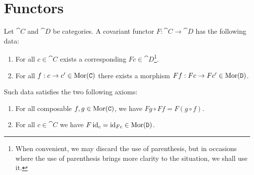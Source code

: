 \section{Functors}

\begin{definition}\label{def: functor}
    Let \(\cat C\) and \(\cat D\) be categories. A covariant functor \(F: \cat C \to
    \cat D\) has the following data:
    \begin{enumerate}[({DF}1)]
        \item For all \(c \in \cat C\) exists a corresponding \(F c \in \cat
              D\)\footnote{When convenient, we may discard the use of parenthesis, but in
                  occasions where the use of parenthesis brings more clarity to the
                  situation, we shall use it.}.
        \item For all \(f: c \to c' \in \operatorname{Mor}(\texttt C)\) there exists a morphism \(F
              f: F c \to F c' \in \operatorname{Mor}(\texttt D)\).
    \end{enumerate}
    Such data satisfies the two following axioms:
    \begin{enumerate}[({AF}1)]
        \item For all composable \(f, g \in \operatorname{Mor}(\texttt C)\), we have \(F g \circ F f
              = F (g \circ f)\).
        \item For all \(c \in \cat C\) we have \(F \operatorname{id}_c = \operatorname{id}_{F c} \in \operatorname{Mor}(\texttt
              D)\).
    \end{enumerate}
\end{definition}

